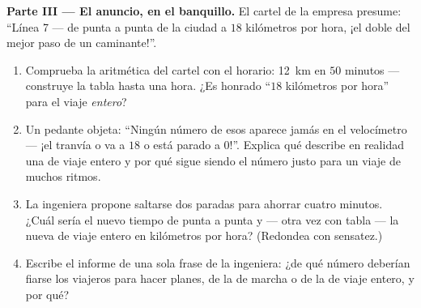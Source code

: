 \begin{problem}
\medskip\noindent\textbf{Parte III --- El anuncio, en el banquillo.}
El cartel de la empresa presume: ``Línea 7 --- de punta a punta de la
ciudad a $18$ kilómetros por hora, ¡el doble del mejor paso de un
caminante!''.
\begin{enumerate}[resume]
  \item Comprueba la aritmética del cartel con el horario:
        \qty{12}{km} en $50$ minutos --- construye la tabla hasta una
        hora. ¿Es honrado ``$18$ kilómetros por hora'' para el viaje
        \emph{entero}?
  \item Un pedante objeta: ``Ningún número de esos aparece jamás en
        el velocímetro --- ¡el tranvía o va a $18$ o está parado a
        $0$!''. Explica qué describe en realidad una
         de viaje entero y por qué sigue siendo el número
        justo para un viaje de muchos ritmos.
  \item La ingeniera propone saltarse dos paradas para ahorrar
        cuatro minutos. ¿Cuál sería el nuevo tiempo de punta a punta
        y --- otra vez con tabla --- la nueva  de viaje
        entero en kilómetros por hora? (Redondea con sensatez.)
  \item Escribe el informe de una sola frase de la ingeniera: ¿de qué
        número deberían fiarse los viajeros para hacer planes, de la
         de marcha o de la  de viaje entero, y
        por qué?
\end{enumerate}
\end{problem}
